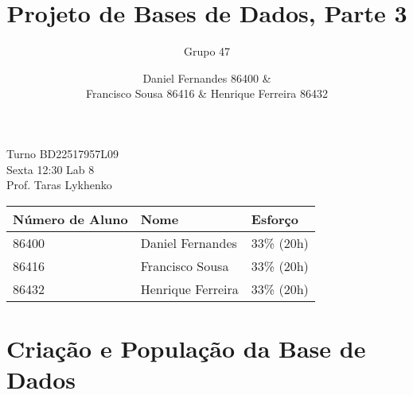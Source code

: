 \documentclass[12pt,a4paper]{article}
\author{Grupo 47 \and Daniel Fernandes 86400 \& \\Francisco Sousa 86416 \& Henrique Ferreira 86432}
\title{Projeto de Bases de Dados, Parte 3}
\begin{document}
\maketitle

\begin{center}
Turno BD22517957L09 \\
Sexta 12:30 Lab 8 \\
Prof. Taras Lykhenko \\
\end{center}

\begin{table}[h]
    \centering
    \begin{tabular}{lll}
    \hline
    \textbf{Número de Aluno} & \textbf{Nome} & \textbf{Esforço} \\ \hline
    86400 & Daniel Fernandes & 33\% (20h) \\ \hline
    86416 & Francisco Sousa & 33\% (20h) \\ \hline
    86432 & Henrique Ferreira & 33\% (20h) \\ \hline
    \end{tabular}
\end{table}
\newpage

\section{Criação e População da Base de Dados}
\end{document}
